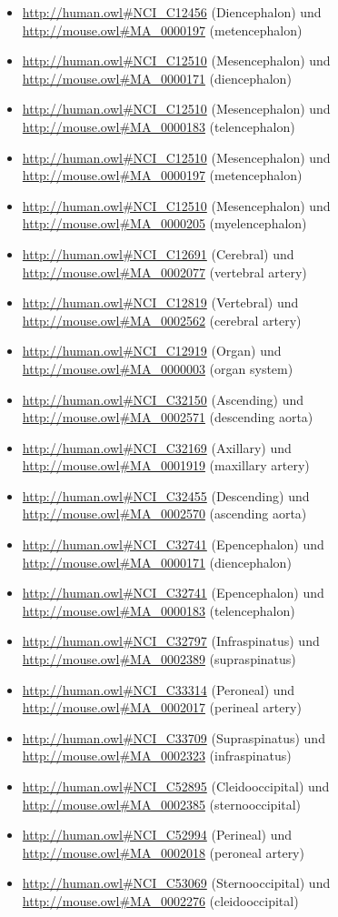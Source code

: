 \begin{itemize}
\item \url{http://human.owl#NCI_C12456} (Diencephalon) und \url{http://mouse.owl#MA_0000197} (metencephalon)
\item \url{http://human.owl#NCI_C12510} (Mesencephalon) und \url{http://mouse.owl#MA_0000171} (diencephalon)
\item \url{http://human.owl#NCI_C12510} (Mesencephalon) und \url{http://mouse.owl#MA_0000183} (telencephalon)
\item \url{http://human.owl#NCI_C12510} (Mesencephalon) und \url{http://mouse.owl#MA_0000197} (metencephalon)
\item \url{http://human.owl#NCI_C12510} (Mesencephalon) und \url{http://mouse.owl#MA_0000205} (myelencephalon)
\item \url{http://human.owl#NCI_C12691} (Cerebral\textunderscoreArtery) und \url{http://mouse.owl#MA_0002077} (vertebral artery)
\item \url{http://human.owl#NCI_C12819} (Vertebral\textunderscoreArtery) und \url{http://mouse.owl#MA_0002562} (cerebral artery)
\item \url{http://human.owl#NCI_C12919} (Organ\textunderscoreSystem) und \url{http://mouse.owl#MA_0000003} (organ system)
\item \url{http://human.owl#NCI_C32150} (Ascending\textunderscoreAorta) und \url{http://mouse.owl#MA_0002571} (descending aorta)
\item \url{http://human.owl#NCI_C32169} (Axillary\textunderscoreArtery) und \url{http://mouse.owl#MA_0001919} (maxillary artery)
\item \url{http://human.owl#NCI_C32455} (Descending\textunderscoreAorta) und \url{http://mouse.owl#MA_0002570} (ascending aorta)
\item \url{http://human.owl#NCI_C32741} (Epencephalon) und \url{http://mouse.owl#MA_0000171} (diencephalon)
\item \url{http://human.owl#NCI_C32741} (Epencephalon) und \url{http://mouse.owl#MA_0000183} (telencephalon)
\item \url{http://human.owl#NCI_C32797} (Infraspinatus) und \url{http://mouse.owl#MA_0002389} (supraspinatus)
\item \url{http://human.owl#NCI_C33314} (Peroneal\textunderscoreArtery) und \url{http://mouse.owl#MA_0002017} (perineal artery)
\item \url{http://human.owl#NCI_C33709} (Supraspinatus) und \url{http://mouse.owl#MA_0002323} (infraspinatus)
\item \url{http://human.owl#NCI_C52895} (Cleidooccipital) und \url{http://mouse.owl#MA_0002385} (sternooccipital)
\item \url{http://human.owl#NCI_C52994} (Perineal\textunderscoreArtery) und \url{http://mouse.owl#MA_0002018} (peroneal artery)
\item \url{http://human.owl#NCI_C53069} (Sternooccipital) und \url{http://mouse.owl#MA_0002276} (cleidooccipital)
\end{itemize}
